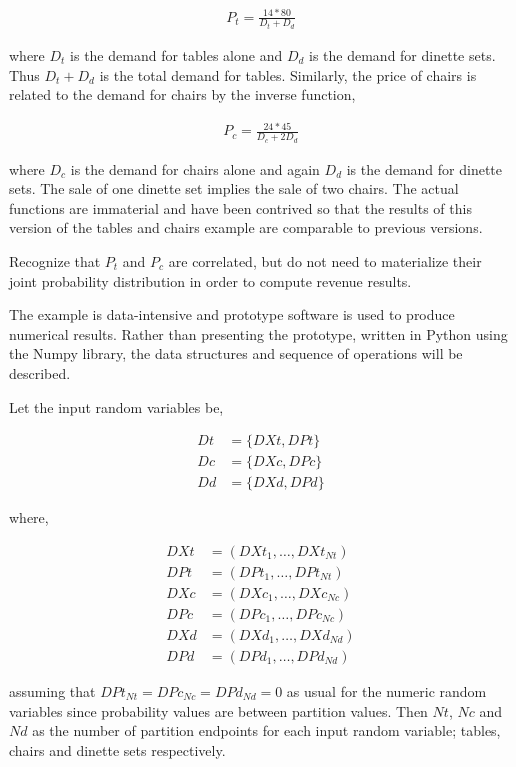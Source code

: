 \begin{align*}
P_t = \frac{14*80}{D_t + D_d}
\end{align*}

where $D_t$ is the demand for tables alone and $D_d$ is the demand for dinette sets. Thus $D_t + D_d$ is the total demand for tables. Similarly, the price of chairs is related to the demand for chairs by the inverse function,

\begin{align*}
P_c = \frac{24*45}{D_c + 2D_d}
\end{align*}

where $D_c$ is the demand for chairs alone and again $D_d$ is the demand for dinette sets. The sale of one dinette set implies the sale of two chairs. The actual functions are immaterial and have been contrived so that the results of this version of the tables and chairs example are comparable to previous versions. 

Recognize that $P_t$ and $P_c$ are correlated, but do not need to materialize their joint probability distribution in order to compute revenue results.

The example is data-intensive and prototype software is used to produce numerical results. Rather than presenting the prototype, written in Python using the Numpy library, the data structures and sequence of operations will be described.

Let the input random variables be,

\begin{align*}
Dt &= \{DXt, DPt\}\\
Dc &= \{DXc, DPc\}\\
Dd &= \{DXd, DPd\}
\end{align*}

where,

\begin{align*}
DXt &= (DXt_1, \dots, DXt_{Nt})\\
DPt &= (DPt_1, \dots, DPt_{Nt})\\
DXc &= (DXc_1, \dots, DXc_{Nc})\\
DPc &= (DPc_1, \dots, DPc_{Nc})\\
DXd &= (DXd_1, \dots, DXd_{Nd})\\
DPd &= (DPd_1, \dots, DPd_{Nd})
\end{align*}

assuming that $DPt_{Nt} = DPc_{Nc} = DPd_{Nd} = 0$ as usual for the numeric random variables since probability values are between partition values. Then $Nt$, $Nc$ and $Nd$ as the number of partition endpoints for each input random variable; tables, chairs and dinette sets respectively.

